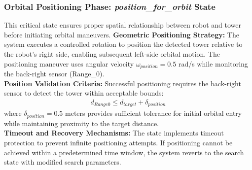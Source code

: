 \subsubsection*{Orbital Positioning Phase: \textit{position\_for\_orbit} State}
This critical state ensures proper spatial relationship between robot and tower before initiating orbital maneuvers.
\textbf{Geometric Positioning Strategy:}
The system executes a controlled rotation to position the detected tower relative to the robot's right side, enabling subsequent left-side orbital motion. The positioning maneuver uses angular velocity $\omega_{position} = 0.5$ rad/s while monitoring the back-right sensor (Range\_0).\\
\textbf{Position Validation Criteria:}
Successful positioning requires the back-right sensor to detect the tower within acceptable bounds:
\begin{align}
d_{Range0} \leq d_{target} + \delta_{position}
\end{align}
where $\delta_{position} = 0.5$ meters provides sufficient tolerance for initial orbital entry while maintaining proximity to the target distance.\\
\textbf{Timeout and Recovery Mechanisms:}
The state implements timeout protection to prevent infinite positioning attempts. If positioning cannot be achieved within a predetermined time window, the system reverts to the search state with modified search parameters.
